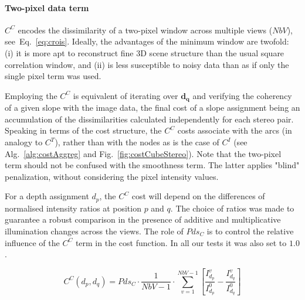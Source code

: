 \documentclass[journal]{IEEEtran}
\begin{document}
\paragraph{Two-pixel data term}
%
$C^C$ encodes the dissimilarity of a two-pixel window across multiple views ($NbV$), see~Eq.~\eqref{eq:crois}. Ideally, the advantages of the minimum window are twofold: (i) it is more apt to reconstruct fine 3D scene structure than the usual square correlation window, and (ii) is less susceptible to noisy data than as if only the single pixel term was used.

Employing the $C^C$ is equivalent of iterating over $\mathbf{d_q}$ and verifying the coherency of a given slope with the image data, the final cost of a slope assignment being an accumulation of the dissimilarities calculated independently for each stereo pair.  Speaking in terms of the cost structure, the $C^C$ costs associate with the arcs (in analogy to $C^T$), rather than with the nodes as is the case of $C^I$ (see Alg.~\ref{alg:costAggreg} and Fig.~\ref{fig:costCubeStereo}). Note that the two-pixel term should not be confused with the smoothness term. The latter applies "blind" penalization, without considering the pixel intensity values.

For a depth assignment $d_p$, the $C^C$ cost will depend on the differences of normalised intensity ratios at position $p$ and $q$. The choice of ratios was made to guarantee a robust comparison in the presence of additive and multiplicative illumination changes across the views.  The role of $Pds_{C}$ is to control the relative influence of the $C^C$ term in the cost function. In  all our tests it was also set to $1.0$.   
%
\begin{figure}[H]
\begin{equation}\label{eq:crois}
C^C({d_p},{d_q}) = Pds_{C} \cdot \frac{1}{NbV-1}  \cdot  \sum_{v=1}^{NbV-1} \left[ \frac{I_{d_p}^v}{I_{d_p}^0} - \frac{I_{d_q}^v}{I_{d_q}^0} \right]
\end{equation}
\end{figure} 
%
\end{document}
